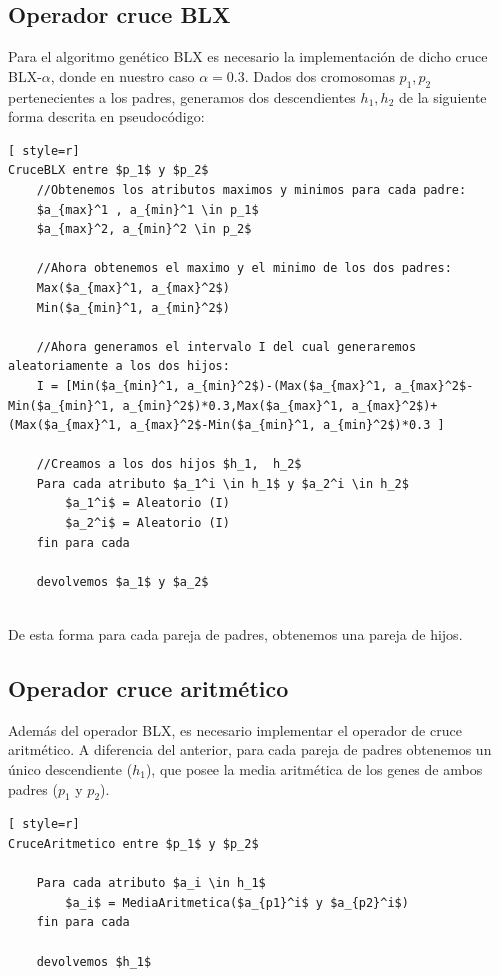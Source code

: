 \subsection{Operador cruce BLX}
Para el algoritmo genético BLX es necesario la implementación de dicho cruce BLX-$\alpha$, donde en nuestro caso $\alpha = 0.3$.
Dados dos cromosomas $p_1,  p_2$ pertenecientes a los padres, generamos dos descendientes $h_1, h_2$
de la siguiente forma descrita en pseudocódigo:

\begin{lstlisting}[ style=r]
CruceBLX entre $p_1$ y $p_2$
	//Obtenemos los atributos maximos y minimos para cada padre:
	$a_{max}^1 , a_{min}^1 \in p_1$
	$a_{max}^2, a_{min}^2 \in p_2$
	
	//Ahora obtenemos el maximo y el minimo de los dos padres:
	Max($a_{max}^1, a_{max}^2$)
	Min($a_{min}^1, a_{min}^2$)
	
	//Ahora generamos el intervalo I del cual generaremos aleatoriamente a los dos hijos:
	I = [Min($a_{min}^1, a_{min}^2$)-(Max($a_{max}^1, a_{max}^2$-Min($a_{min}^1, a_{min}^2$)*0.3,Max($a_{max}^1, a_{max}^2$)+(Max($a_{max}^1, a_{max}^2$-Min($a_{min}^1, a_{min}^2$)*0.3 ]
	
	//Creamos a los dos hijos $h_1,  h_2$
	Para cada atributo $a_1^i \in h_1$ y $a_2^i \in h_2$
		$a_1^i$ = Aleatorio (I)
		$a_2^i$ = Aleatorio (I)
	fin para cada
	
	devolvemos $a_1$ y $a_2$
		
\end{lstlisting}

De esta forma para cada pareja de padres, obtenemos una pareja de hijos.


\subsection{Operador cruce aritmético}
Además del operador BLX, es necesario implementar el operador de cruce aritmético. A diferencia del anterior, para cada pareja de padres obtenemos un único descendiente ($h_1$), que posee la media aritmética de los genes de ambos padres ($p_1$ y $p_2$).

\begin{lstlisting}[ style=r]
CruceAritmetico entre $p_1$ y $p_2$

	Para cada atributo $a_i \in h_1$
		$a_i$ = MediaAritmetica($a_{p1}^i$ y $a_{p2}^i$)
	fin para cada
	
	devolvemos $h_1$

\end{lstlisting}


